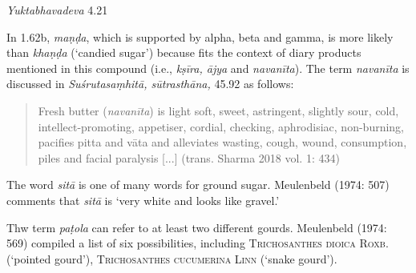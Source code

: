 \begin{ekdosis}
\begin{testimonia}[hp01_062]
\begin{versinnote}
\tl{\var{°phalapatraja° ] phalādika N,n1,J. yamīndra° ] yatīndra° N,n1,J}\\!}
\end{versinnote}

\emph{Yuktabhavadeva} 4.21

\begin{versinnote}
\end{versinnote}

\end{testimonia}

\begin{philcomm}[hp01_062]
In 1.62b, \emph{maṇḍa}, which is supported by alpha, beta and gamma, is more likely than \emph{khaṇḍa} (`candied sugar') because fits the context of diary products mentioned in this compound (i.e., \emph{kṣīra, ājya} and \emph{navanīta}). The term \emph{navanīta} is discussed in \emph{Suśrutasaṃhitā, sūtrasthāna,} 45.92 as follows:
\begin{quote}
Fresh butter (\emph{navanīta}) is light soft, sweet, astringent, slightly sour, cold, intellect-promoting, appetiser, cordial, checking, aphrodisiac, non-burning, pacifies pitta and vāta and alleviates wasting, cough, wound, consumption, piles and facial paralysis [...] (trans. Sharma 2018 vol. 1: 434)
\end{quote}

The word \emph{sitā} is one of many words for ground sugar. Meulenbeld (1974: 507) comments that \emph{sitā} is `very white and looks like gravel.'

Thw term \emph{paṭola} can refer to at least two different gourds. Meulenbeld (1974: 569) compiled a list of six possibilities, including \textsc{Trichosanthes dioica} \textsc{Roxb}. (`pointed gourd'), \textsc{Trichosanthes cucumerina} \textsc{Linn} (`snake gourd').


\end{philcomm}
\end{ekdosis}
